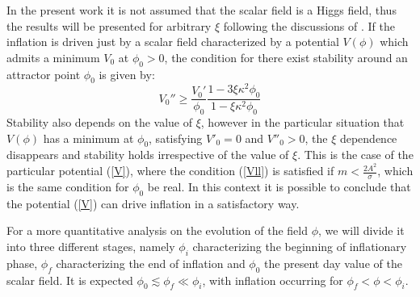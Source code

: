 \documentclass[preprintnumbers,amsmath,amssymb,nofootinbib]{revtex4}
\begin{document}
In the present work it is not assumed that the scalar field is a Higgs field, thus the results will be presented for arbitrary $\xi$ following the discussions of \cite{faraoni2001}. If the inflation is driven just by a scalar field characterized by a potential $V(\phi)$ which admits a minimum $V_0$ at $\phi_0 > 0$, the condition for there exist stability around an attractor point $\phi_0$ is given by:
\begin{equation}
    V_0'' \geq \frac{V_0'}{\phi_0}\frac{1-3\xi \kappa^2 \phi_0}{1-\xi \kappa^2 \phi_0}\label{Vll}
\end{equation}
Stability also depends on the value of $\xi$, however in the particular situation that $V(\phi)$ has a minimum at $\phi_0$, satisfying $V'_0 = 0$ and $V''_0 > 0$, the $\xi$ dependence disappears and stability holds irrespective of the value of $\xi$. This is the case of the particular potential (\ref{V}), where the condition (\ref{Vll}) is satisfied if $m<\frac{2A^2}{\sigma}$, which is the same condition for $\phi_0$ be real. In this context it is possible to conclude that the potential (\ref{V}) can drive inflation in a satisfactory way.

For a more quantitative analysis on the evolution of the field $\phi$, we will divide it into three different stages, namely $\phi_i$ characterizing the beginning of inflationary phase, $\phi_f$ characterizing the end of inflation and $\phi_0$ the present day value of the scalar field. It is expected $\phi_0 \lesssim \phi_f \ll \phi_i$, with inflation occurring for $\phi_f < \phi < \phi_i$. 
\end{document}
